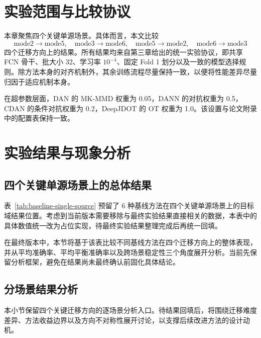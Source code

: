 \section{实验范围与比较协议}
本章聚焦四个关键单源场景。具体而言，本文比较
\begin{equation*}
\mathrm{mode2}\rightarrow\mathrm{mode5},\quad
\mathrm{mode3}\rightarrow\mathrm{mode6},\quad
\mathrm{mode5}\rightarrow\mathrm{mode2},\quad
\mathrm{mode6}\rightarrow\mathrm{mode3}
\end{equation*}
四个迁移方向上的结果。所有结果均来自第三章给出的统一实验协议，即共享 FCN 骨干、批大小 32、学习率 $10^{-4}$、固定 Fold 1 划分以及一致的模型选择规则。除方法本身的对齐机制外，其余训练流程尽量保持一致，以便将性能差异尽量归因于适应机制本身。

在超参数层面，DAN 的 MK-MMD 权重为 0.05，DANN 的对抗权重为 0.5，CDAN 的条件对抗权重为 0.2，DeepJDOT 的 OT 权重为 1.0。该设置与论文附录中的配置表保持一致。

\section{实验结果与现象分析}
\subsection{四个关键单源场景上的总体结果}
表~\ref{tab:baseline-single-source} 预留了 6 种基线方法在四个关键单源场景上的目标域结果位置。考虑到当前版本需要移除与最终实验结果直接相关的数据，本表中的具体数值统一改为占位实现，待最终实验结果整理完成后再统一回填。

\begin{table}[htbp]
\centering
\caption{四个关键单源场景上的基线结果（占位）}
\label{tab:baseline-single-source}
\small
{}
\normalsize
\end{table}

在最终版本中，本节将基于该表比较不同基线方法在四个迁移方向上的整体表现，并从平均准确率、平均平衡准确率以及跨场景稳定性三个角度展开分析。当前先保留分析框架，避免在结果尚未最终确认前固化具体结论。

\subsection{分场景结果分析}
本小节保留四个关键迁移方向的逐场景分析入口。待结果回填后，将围绕迁移难度差异、方法收益边界以及方向不对称性展开讨论，以支撑后续改进方法的设计动机。

